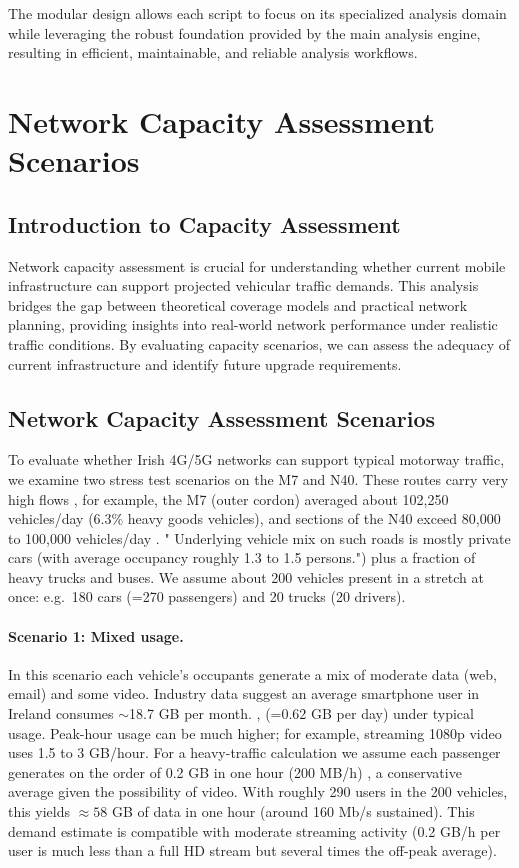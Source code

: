 \documentclass[MScCS]{uccthesis}
\begin{document}
The modular design allows each script to focus on its specialized analysis domain while leveraging the robust foundation provided by the main analysis engine, resulting in efficient, maintainable, and reliable analysis workflows.


\section{Network Capacity Assessment Scenarios}

\subsection{Introduction to Capacity Assessment}
Network capacity assessment is crucial for understanding whether current mobile infrastructure can support projected vehicular traffic demands. This analysis bridges the gap between theoretical coverage models and practical network planning, providing insights into real-world network performance under realistic traffic conditions. By evaluating capacity scenarios, we can assess the adequacy of current infrastructure and identify future upgrade requirements.

\subsection{Network Capacity Assessment Scenarios}
To evaluate whether Irish 4G/5G networks can support typical motorway traffic, we examine two stress test scenarios on the M7 and N40. These routes carry very high flows , for example, the M7 (outer cordon) averaged about 102,250 vehicles/day (6.3\% heavy goods vehicles)\cite{tii_m7_traffic}, and sections of the N40 exceed 80,000 to 100,000 vehicles/day \cite{tii_n40_traffic}.  " Underlying vehicle mix on such roads is mostly private cars (with average occupancy roughly 1.3 to 1.5 persons."\cite{eea_occupancy}) plus a fraction of heavy trucks and buses. We assume about 200 vehicles present in a stretch at once: e.g.\ 180 cars (=270 passengers) and 20 trucks (20 drivers).

\paragraph{Scenario 1: Mixed usage.} In this scenario each vehicle's occupants generate a mix of moderate data (web, email) and some video. Industry data suggest an average smartphone user in Ireland consumes $\sim$18.7 GB per month.\cite{comreg_mobile_usage} , (=0.62 GB per day) under typical usage. Peak-hour usage can be much higher; for example, streaming 1080p video uses 1.5 to 3 GB/hour\cite{roamless_streaming}. For a heavy-traffic calculation we assume each passenger generates on the order of 0.2 GB in one hour (200 MB/h) , a conservative average given the possibility of video. With roughly 290 users in the 200 vehicles, this yields $\approx 58$ GB of data in one hour (around 160 Mb/s sustained). This demand estimate is compatible with moderate streaming activity (0.2 GB/h per user is much less than a full HD stream\cite{roamless_streaming} but several times the off-peak average\cite{comreg_mobile_usage}).
\end{document}
